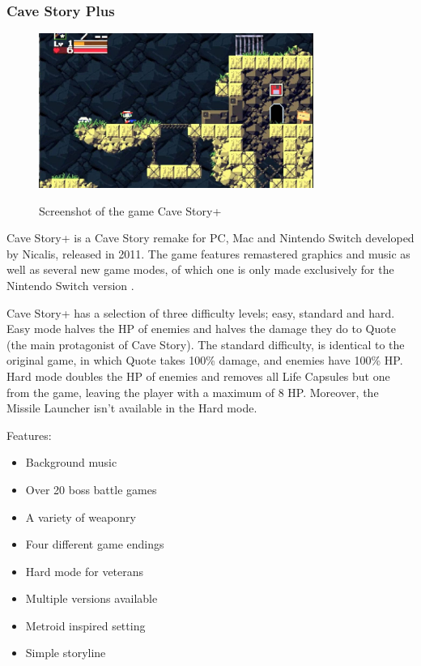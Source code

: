 \documentclass[12p]{article}
\begin{document}

\newpage
\subsubsection[Cave Story Plus]{Cave Story Plus \cite{CaveStoryPlusSteam}}

\begin{figure}[ht]
  \center
  \includegraphics[width=0.8\textwidth]{StateOfTheArtScreenshots/cave_story_plus}
  \label{sec:StateOfTheArt_Screenshots_CaveStoryPlus}
  \caption{Screenshot of the game Cave Story+ \cite{CaveStoryPlusScreenshot}}
\end{figure}

Cave Story+ is a Cave Story remake for PC, Mac and Nintendo Switch developed by Nicalis, released in 2011. The game features remastered graphics and music as well as several new game modes, of which one is only made exclusively for the Nintendo Switch version \cite{CaveStoryPlusWiki}.

Cave Story+ has a selection of three difficulty levels; easy, standard and hard. Easy mode halves the HP of enemies and halves the damage they do to Quote (the main protagonist of Cave Story). The standard difficulty, is identical to the original game, in which Quote takes 100\% damage, and enemies have 100\% HP. Hard mode doubles the HP of enemies and removes all Life Capsules but one from the game, leaving the player with a maximum of 8 HP. Moreover, the Missile Launcher isn't available in the Hard mode.

Features:

\begin{itemize}
  \item Background music
  \item Over 20 boss battle games
  \item A variety of weaponry
  \item Four different game endings
  \item Hard mode for veterans
  \item Multiple versions available
  \item Metroid inspired setting
  \item Simple storyline
\end{itemize}
\end{document}
